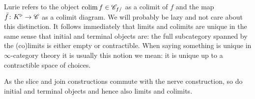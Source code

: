 \documentclass[../../thesis.tex]{subfiles}
\begin{document}
Lurie \cite{HTT} refers to the object $\operatorname*{colim} f \in \mathscr{C}_{f/}$ as a colimit of $f$ and the map $\bar{f}\colon K^{\triangleright} \to \mathscr{C}$ as a colimit diagram.
We will probably be lazy and not care about this distinction.
It follows immediately that limits and colimits are unique in the same sense that initial and terminal objects are: the full subcategory spanned by the (co)limits is either empty or contractible.
When saying something is unique in $\infty$-category theory it is usually this notion we mean: it is unique up to a contractible space of choices.
\begin{remark}
    As the slice and join constructions commute with the nerve construction, so do initial and terminal objects and hence also limits and colimits.
\end{remark}
\end{document}
